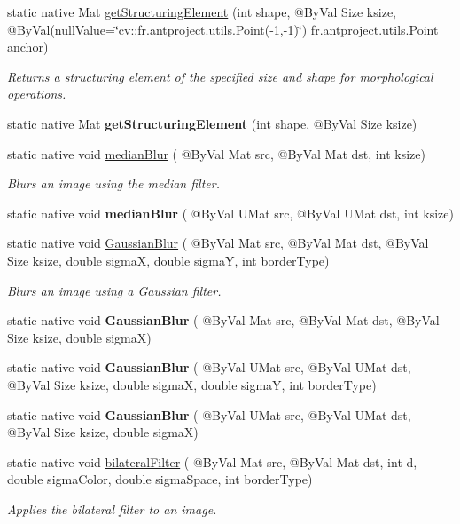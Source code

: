 \begin{DoxyCompactItemize}
static native Mat \hyperlink{group__imgproc__filter_ga18af407581ba537b9095d14090cce31a}{get\+Structuring\+Element} (int shape, @By\+Val Size ksize, @By\+Val(null\+Value=\char`\"{}cv\+::\+fr.antproject.utils.Point(-\/1,-\/1)\char`\"{}) fr.antproject.utils.Point anchor)
\begin{DoxyCompactList}\small\item\em Returns a structuring element of the specified size and shape for morphological operations. \end{DoxyCompactList}\item 
static native Mat {\bfseries get\+Structuring\+Element} (int shape, @By\+Val Size ksize)
\item 
static native void \hyperlink{group__imgproc__filter_ga6a7fd362c0b073cd051d4fcb7a9904c9}{median\+Blur} ( @By\+Val Mat src, @By\+Val Mat dst, int ksize)
\begin{DoxyCompactList}\small\item\em Blurs an image using the median filter. \end{DoxyCompactList}\item 
static native void {\bfseries median\+Blur} ( @By\+Val U\+Mat src, @By\+Val U\+Mat dst, int ksize)
\item 
static native void \hyperlink{group__imgproc__filter_gaf8f0c37e9b9c420a8edfc2753c8fe966}{Gaussian\+Blur} ( @By\+Val Mat src, @By\+Val Mat dst, @By\+Val Size ksize, double sigmaX, double sigmaY, int border\+Type)
\begin{DoxyCompactList}\small\item\em Blurs an image using a Gaussian filter. \end{DoxyCompactList}\item 
static native void {\bfseries Gaussian\+Blur} ( @By\+Val Mat src, @By\+Val Mat dst, @By\+Val Size ksize, double sigmaX)
\item 
static native void {\bfseries Gaussian\+Blur} ( @By\+Val U\+Mat src, @By\+Val U\+Mat dst, @By\+Val Size ksize, double sigmaX, double sigmaY, int border\+Type)
\item 
static native void {\bfseries Gaussian\+Blur} ( @By\+Val U\+Mat src, @By\+Val U\+Mat dst, @By\+Val Size ksize, double sigmaX)
\item 
static native void \hyperlink{group__imgproc__filter_ga15d81db5deb10dd5c7f6ff4b6193a644}{bilateral\+Filter} ( @By\+Val Mat src, @By\+Val Mat dst, int d, double sigma\+Color, double sigma\+Space, int border\+Type)
\begin{DoxyCompactList}\small\item\em Applies the bilateral filter to an image. \end{DoxyCompactList}\item 

\end{DoxyCompactItemize}
